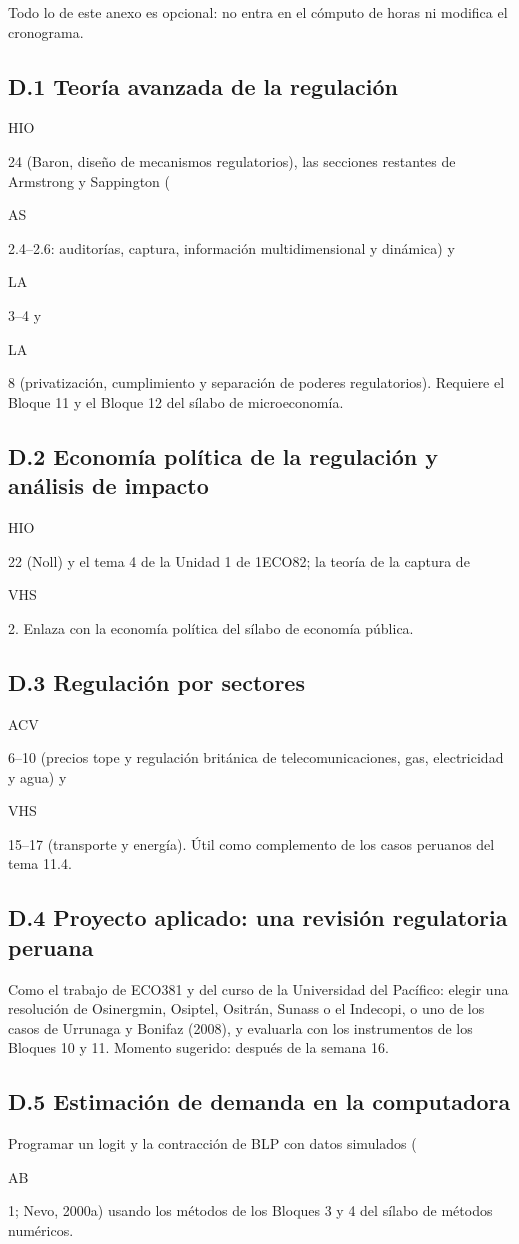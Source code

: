 \documentclass[11pt,a4paper]{article}
\newcommand{\etiqueta}[2]{%
  {\setlength{\fboxsep}{1.4pt}\colorbox{#1}{\sffamily\bfseries\color{white}\strut#2}}}
\newcommand{\VHS}[1]{\etiqueta{colorVHS}{VHS}\nobreak\hspace{0.25em}\textcolor{colorVHS}{#1}}
\newcommand{\AS}[1]{\etiqueta{colorAS}{AS}\nobreak\hspace{0.25em}\textcolor{colorAS}{#1}}
\newcommand{\LA}[1]{\etiqueta{colorLA}{LA}\nobreak\hspace{0.25em}\textcolor{colorLA}{#1}}
\newcommand{\ACV}[1]{\etiqueta{colorACV}{ACV}\nobreak\hspace{0.25em}\textcolor{colorACV}{#1}}
\newcommand{\HIO}[1]{\etiqueta{colorHIO}{HIO}\nobreak\hspace{0.25em}\textcolor{colorHIO}{#1}}
\newcommand{\AB}[1]{\etiqueta{colorAB}{AB}\nobreak\hspace{0.25em}\textcolor{colorAB}{#1}}
\begin{document}
Todo lo de este anexo es opcional: no entra en el cómputo de horas ni modifica
el cronograma.

\subsection*{D.1 Teoría avanzada de la regulación}
\HIO{24} (Baron, diseño de mecanismos regulatorios), las secciones restantes
de Armstrong y Sappington (\AS{2.4--2.6}: auditorías, captura, información
multidimensional y dinámica) y \LA{3--4} y \LA{8} (privatización,
cumplimiento y separación de poderes regulatorios). Requiere el Bloque 11 y
el Bloque 12 del sílabo de microeconomía.

\subsection*{D.2 Economía política de la regulación y análisis de impacto}
\HIO{22} (Noll) y el tema 4 de la Unidad 1 de 1ECO82; la teoría de la captura
de \VHS{2}. Enlaza con la economía política del sílabo de economía pública.

\subsection*{D.3 Regulación por sectores}
\ACV{6--10} (precios tope y regulación británica de telecomunicaciones, gas,
electricidad y agua) y \VHS{15--17} (transporte y energía). Útil como
complemento de los casos peruanos del tema 11.4.

\subsection*{D.4 Proyecto aplicado: una revisión regulatoria peruana}
Como el trabajo de ECO381 y del curso de la Universidad del Pacífico: elegir
una resolución de Osinergmin, Osiptel, Ositrán, Sunass o el Indecopi, o uno
de los casos de Urrunaga y Bonifaz (2008), y evaluarla con los instrumentos
de los Bloques 10 y 11. Momento sugerido: después de la semana 16.

\subsection*{D.5 Estimación de demanda en la computadora}
Programar un logit y la contracción de BLP con datos simulados (\AB{1};
Nevo, 2000a) usando los métodos de los Bloques 3 y 4 del sílabo de métodos
numéricos.

\end{document}
